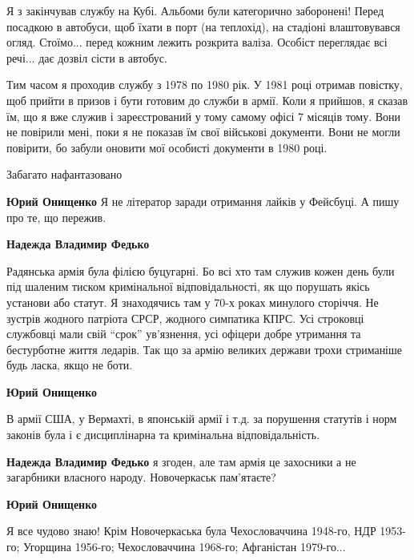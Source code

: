 \begin{itemize}
\begin{itemize}

Я з закінчував службу на Кубі. Альбоми були категорично заборонені! Перед
посадкою в автобуси, щоб їхати в порт (на теплохід), на стадіоні влаштовувався
огляд. Стоїмо... перед кожним лежить розкрита валіза. Особіст переглядає всі
речі... дає дозвіл сісти в автобус.

\end{itemize} %


Тим часом я проходив службу з 1978 по 1980 рік. У 1981 році отримав повістку,
щоб прийти в призов і бути готовим до служби в армії. Коли я прийшов, я сказав
їм, що я вже служив і зареєстрований у тому самому офісі 7 місяців тому. Вони
не повірили мені, поки я не показав їм свої військові документи. Вони не могли
повірити, бо забули оновити мої особисті документи в 1980 році.


Забагато нафантазовано

\begin{itemize} %
\textbf{Юрий Онищенко} Я не літератор заради отримання лайків у Фейсбуці. А пишу про те, що пережив.

\begin{itemize} %
\textbf{Надежда Владимир Федько} 

Радянська армія була філією буцугарні. Бо всі хто там служив кожен день були
під шаленим тиском кримінальної відповідальності, як що порушать якісь установи
або статут. Я знаходячись там у 70-х роках минулого сторіччя. Не зустрів
жодного патріота СРСР, жодного симпатика КПРС. Усі строковці службовці мали
свій \enquote{срок} ув'язнення, усі офіцери добре утримання та бестурботне життя
ледарів. Так що за армію великих держави трохи стриманіше будь ласка, якщо не
боти.


\textbf{Юрий Онищенко} 

В армії США, у Вермахті, в японській армії і т.д. за порушення статутів і норм
законів була і є дисциплінарна та кримінальна відповідальність.

\textbf{Надежда Владимир Федько} я згоден, але там армія це захосники а не загарбники власного народу. Новочеркаськ пам'ятаєте?

\textbf{Юрий Онищенко} 

Я все чудово знаю! Крім Новочеркаська була Чехословаччина 1948-го, НДР 1953-го;
Угорщина 1956-го; Чехословаччина 1968-го; Афганістан 1979-го...



\end{itemize}
\end{itemize}
\end{itemize}
